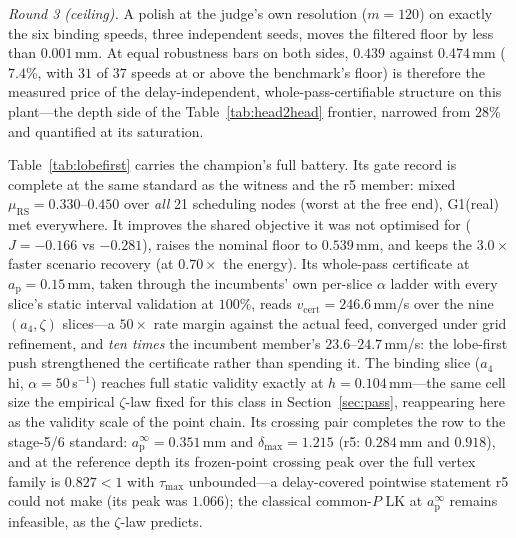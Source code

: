 \documentclass[preprint,12pt]{elsarticle}
\newcommand{\ap}{a_{\mathrm{p}}}
\newcommand{\vcert}{v_{\mathrm{cert}}}
\newcommand{\muRS}{\mu_{\mathrm{RS}}}
\begin{document}
\emph{Round 3 (ceiling).}  A polish at the judge's own resolution
($m = 120$) on exactly the six binding speeds, three independent
seeds, moves the filtered floor by less than $0.001$\,mm.  At equal
robustness bars on both sides, $0.439$ against $0.474$\,mm
($7.4\%$, with $31$ of $37$ speeds at or above the benchmark's
floor) is therefore the measured price of the delay-independent,
whole-pass-certifiable structure on this plant---the depth side of
the Table~\ref{tab:head2head} frontier, narrowed from $28\%$ and
quantified at its saturation.

Table~\ref{tab:lobefirst} carries the champion's full battery.  Its
gate record is complete at the same standard as the witness and the
r5 member: mixed $\muRS = 0.330$--$0.450$ over \emph{all} 21
scheduling nodes (worst at the free end), G1(real) met everywhere.
It improves the shared objective it was not optimised for
($J = -0.166$ vs $-0.281$), raises the nominal floor to $0.539$\,mm,
and keeps the $3.0\times$ faster scenario recovery (at $0.70\times$
the energy).  Its whole-pass certificate at $\ap = 0.15$\,mm, taken
through the incumbents' own per-slice $\alpha$ ladder with every
slice's static interval validation at $100\%$, reads
$\vcert = 246.6$\,mm/s over the nine $(a_4, \zeta)$ slices---a
$50\times$ rate margin against the actual feed, converged under grid
refinement, and \emph{ten times} the incumbent member's
$23.6$--$24.7$\,mm/s: the lobe-first push strengthened the
certificate rather than spending it.  The binding slice ($a_4$ hi,
$\alpha = 50$\,s$^{-1}$) reaches full static validity exactly at
$h = 0.104$\,mm---the same cell size the empirical $\zeta$-law fixed
for this class in Section~\ref{sec:pass}, reappearing here as the
validity scale of the point chain.  Its crossing pair completes the
row to the stage-5/6 standard: $\ap^{\infty} = 0.351$\,mm and
$\delta_{\max} = 1.215$ (r5: $0.284$\,mm and $0.918$), and at the
reference depth its frozen-point crossing peak over the full vertex
family is $0.827 < 1$ with $\tau_{\max}$ unbounded---a delay-covered
pointwise statement r5 could not make (its peak was $1.066$); the
classical common-$P$ LK at $\ap^{\infty}$ remains infeasible, as the
$\zeta$-law predicts.
\end{document}
